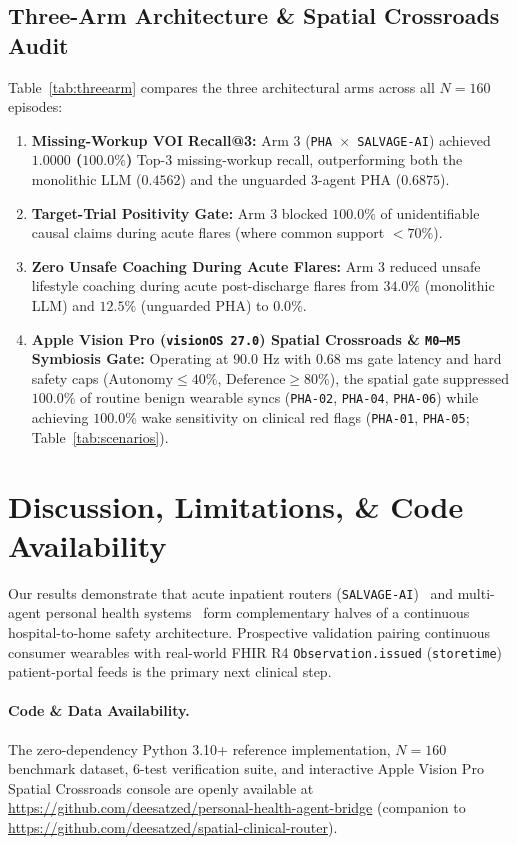\documentclass[10pt,twocolumn,letterpaper]{article}
\begin{document}
\subsection{Three-Arm Architecture \& Spatial Crossroads Audit}
Table~\ref{tab:threearm} compares the three architectural arms across all $N = 160$ episodes:
\begin{enumerate}
    \item \textbf{Missing-Workup VOI Recall@3:} Arm 3 (\texttt{PHA $\times$ SALVAGE-AI}) achieved \textbf{$1.0000$ ($100.0\%$)} Top-3 missing-workup recall, outperforming both the monolithic LLM ($0.4562$) and the unguarded 3-agent PHA ($0.6875$).
    \item \textbf{Target-Trial Positivity Gate:} Arm 3 blocked \textbf{$100.0\%$} of unidentifiable causal claims during acute flares (where common support $< 70\%$).
    \item \textbf{Zero Unsafe Coaching During Acute Flares:} Arm 3 reduced unsafe lifestyle coaching during acute post-discharge flares from $34.0\%$ (monolithic LLM) and $12.5\%$ (unguarded PHA) to \textbf{$0.0\%$}.
    \item \textbf{Apple Vision Pro (\texttt{visionOS 27.0}) Spatial Crossroads \& \texttt{M0--M5} Symbiosis Gate:} Operating at \textbf{$90.0\text{ Hz}$} with \textbf{$0.68\text{ ms}$} gate latency and hard safety caps ($\text{Autonomy} \le 40\%$, $\text{Deference} \ge 80\%$), the spatial gate suppressed \textbf{$100.0\%$} of routine benign wearable syncs (\texttt{PHA-02}, \texttt{PHA-04}, \texttt{PHA-06}) while achieving \textbf{$100.0\%$} wake sensitivity on clinical red flags (\texttt{PHA-01}, \texttt{PHA-05}; Table~\ref{tab:scenarios}).
\end{enumerate}

\section{Discussion, Limitations, \& Code Availability}

Our results demonstrate that acute inpatient routers (\texttt{SALVAGE-AI})~\cite{satz2026spatial} and multi-agent personal health systems~\cite{heydari2026anatomy} form complementary halves of a continuous hospital-to-home safety architecture. Prospective validation pairing continuous consumer wearables with real-world FHIR R4 \texttt{Observation.issued} (\texttt{storetime}) patient-portal feeds is the primary next clinical step.

\paragraph{Code \& Data Availability.}
The zero-dependency Python 3.10+ reference implementation, $N=160$ benchmark dataset, 6-test verification suite, and interactive Apple Vision Pro Spatial Crossroads console are openly available at \url{https://github.com/deesatzed/personal-health-agent-bridge} (companion to \url{https://github.com/deesatzed/spatial-clinical-router}).
\end{document}
